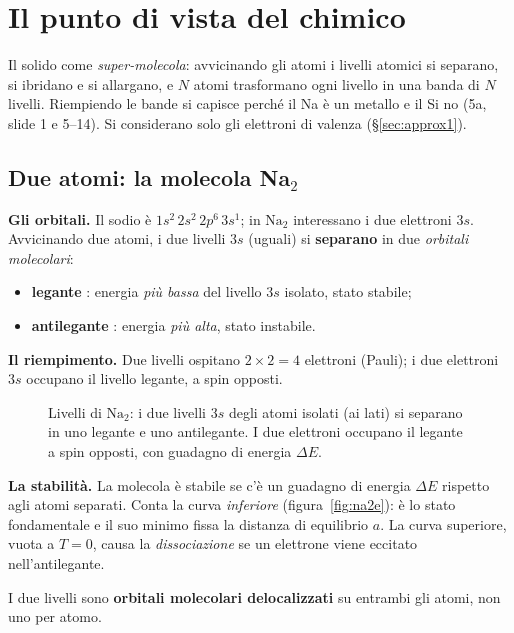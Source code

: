 \documentclass[11pt,a4paper]{article}
\begin{document}
\section{Il punto di vista del chimico}\label{sec:chimico}
Il solido come \emph{super-molecola}: avvicinando gli atomi i livelli atomici si separano, si ibridano e si allargano, e $N$ atomi trasformano ogni
livello in una banda di $N$ livelli. Riempiendo le bande si capisce perché il Na è un metallo e il Si no (5a, slide 1 e 5--14). Si considerano solo gli
elettroni di valenza (§\ref{sec:approx1}).

\subsection{Due atomi: la molecola Na$_2$}
\textbf{Gli orbitali.} Il sodio è $1s^2\,2s^2\,2p^6\,3s^1$; in $\mathrm{Na_2}$ interessano i due elettroni $3s$. Avvicinando due atomi, i due livelli $3s$
(uguali) si \textbf{separano} in due \emph{orbitali molecolari}:
\begin{itemize}[leftmargin=*]
\item \textbf{legante} : energia \emph{più bassa} del livello $3s$ isolato, stato stabile;
\item \textbf{antilegante} : energia \emph{più alta}, stato instabile.
\end{itemize}

\textbf{Il riempimento.} Due livelli ospitano $2\times2=4$ elettroni (Pauli); i due elettroni $3s$ occupano il livello legante, a spin opposti.

\begin{figure}[tbp]
\centering
{}
\caption{Livelli di $\mathrm{Na_2}$: i due livelli $3s$ degli atomi isolati (ai lati) si separano in uno legante e uno antilegante. I due
elettroni occupano il legante a spin opposti, con guadagno di energia $\Delta E$.}
\end{figure}

\textbf{La stabilità.} La molecola è stabile se c'è un guadagno di energia $\Delta E$ rispetto agli atomi separati. Conta la curva
\emph{inferiore} (figura~\ref{fig:na2e}): è lo stato fondamentale e il suo minimo fissa la distanza di equilibrio $a$. La curva superiore, vuota
a $T=0$, causa la \emph{dissociazione} se un elettrone viene eccitato nell'antilegante.

\begin{osservazione}
I due livelli sono \textbf{orbitali molecolari delocalizzati} su entrambi gli atomi, non uno per atomo.
\end{osservazione}
\end{document}
